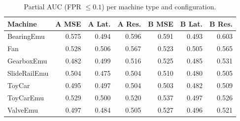 \begin{table}[!htb]
\centering
\caption{Partial AUC (FPR $\le 0.1$) per machine type and configuration.}
\label{tab:machine_pauc}
\footnotesize
\renewcommand{\arraystretch}{1.18}
\begin{tabular}{lrrrrrr}
\toprule
Machine & A MSE & A Lat. & A Res. & B MSE & B Lat. & B Res. \\
\midrule
BearingEmu & 0.575 & 0.494 & 0.596 & 0.591 & 0.493 & 0.603 \\
Fan & 0.528 & 0.506 & 0.567 & 0.523 & 0.505 & 0.565 \\
GearboxEmu & 0.482 & 0.499 & 0.516 & 0.525 & 0.485 & 0.531 \\
SlideRailEmu & 0.504 & 0.475 & 0.504 & 0.510 & 0.480 & 0.505 \\
ToyCar & 0.495 & 0.497 & 0.504 & 0.503 & 0.482 & 0.509 \\
ToyCarEmu & 0.529 & 0.500 & 0.520 & 0.537 & 0.497 & 0.526 \\
ValveEmu & 0.497 & 0.484 & 0.505 & 0.527 & 0.496 & 0.521 \\
\bottomrule
\end{tabular}
\end{table}